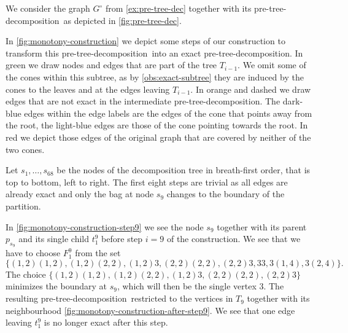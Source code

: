 \documentclass{lmcs}
\theoremstyle{plain}\newtheorem{claim}[thm]{Claim}   %
\newcommand{\preTreeDec}{pre-tree-decomposition}
\begin{document}
\begin{exa}
	\label{ex:monotony-construction}
	We consider the graph $G^\circ$ from \autoref{ex:pre-tree-dec} together with its \preTreeDec\ as depicted in \autoref{fig:pre-tree-dec}.
	
	In \autoref{fig:monotony-construction} we depict some steps of our construction to transform this \preTreeDec\ into an exact \preTreeDec.
	In green we draw nodes and edges that are part of the tree $T_{i-1}$.
	We omit some of the cones within this subtree, as by \autoref{obs:exact-subtree} they are induced by the cones to the leaves and at the edges leaving $T_{i-1}$.
	In orange and dashed we draw edges that are not exact in the intermediate \preTreeDec.
	The dark-blue edges within the edge labels are the edges of the cone that points away from the root, the light-blue edges are those of the cone pointing towards the root.
	In red we depict those edges of the original graph that are covered by neither of the two cones.
	
	Let $s_1,\ldots,s_{68}$ be the nodes of the decomposition tree in breath-first order, that is top to bottom, left to right.
	The first eight steps are trivial as all edges are already exact and only the bag at node $s_9$ changes to the boundary of the partition.
	
	In \autoref{fig:monotony-construction-step9} we see the node $s_9$ together with its parent $p_{s_9}$ and its single child $t^9_1$ before step $i=9$ of the construction.
	We see that we have to choose $F^9_1$ from the set \[\{(1,2)(1,2), (1,2)(2,2), (1,2)3, (2,2)(2,2), (2,2)3, 33, 3(1,4), 3(2,4)\}.\]
	The choice $\{(1,2)(1,2), (1,2)(2,2), (1,2)3, (2,2)(2,2), (2,2)3\}$ minimizes the boundary at $s_9$, which will then be the single vertex $3$.
	The resulting \preTreeDec\ restricted to the vertices in $T_9$ together with its neighbourhood \autoref{fig:monotony-construction-after-step9}.
	We see that one edge leaving $t^9_1$ is no longer exact after this step.
	

\end{exa}
\end{document}
